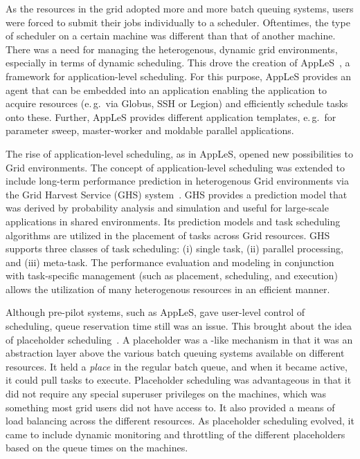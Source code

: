 \documentclass{sig-alternate}
\begin{document}
As the resources in the grid adopted more and more batch queuing systems, users were forced to submit their jobs individually to a scheduler. Oftentimes, the type of scheduler on a certain machine was different than that of another machine. There was a need for managing the heterogenous, dynamic grid environments, especially in terms of dynamic scheduling. This drove the creation of AppLeS~\cite{Berman:2003:ACG:766629.766632}, a framework for 
application-level scheduling. For this purpose, AppLeS provides an agent that 
can be embedded into an application enabling the application to acquire 
resources (e.\,g.\ via Globus, SSH or Legion) and efficiently schedule tasks 
onto these. Further, AppLeS provides different application templates,
e.\,g.\ for parameter sweep, master-worker and moldable parallel applications.

The rise of application-level scheduling, as in AppLeS, opened new possibilities to Grid environments. The concept of application-level scheduling was extended to include long-term performance prediction in heterogenous Grid environments via the Grid Harvest Service (GHS) system~\cite{ghs}. GHS provides a prediction model that was derived by probability analysis and simulation and useful for large-scale applications in shared environments. Its prediction models and task scheduling algorithms are utilized in the placement of tasks across Grid resources. GHS supports three classes of task scheduling: (i) single task, (ii) parallel processing, and (iii) meta-task. The performance evaluation and modeling in conjunction with task-specific management (such as placement, scheduling, and execution) allows the utilization of many heterogenous resources in an efficient manner.

Although pre-pilot systems, such as AppLeS, gave user-level control of scheduling, queue reservation time still was an issue. This brought about the idea of placeholder scheduling~\cite{Pinchak02practicalheterogeneous, Singh:2008:WTC:1341811.1341822}. A placeholder was a \pilot-like mechanism in that it was an abstraction layer above the various batch queuing systems available on different resources. It held a \textit{place} in the regular batch queue, and when it became active, it could pull tasks to execute. Placeholder scheduling was advantageous in that it did not require any special superuser privileges on the machines, which was something most grid users did not have access to. It also provided a means of load balancing across the different resources. As placeholder scheduling evolved, it came to include dynamic monitoring and throttling of the different placeholders based on the queue times on the machines.
\end{document}
